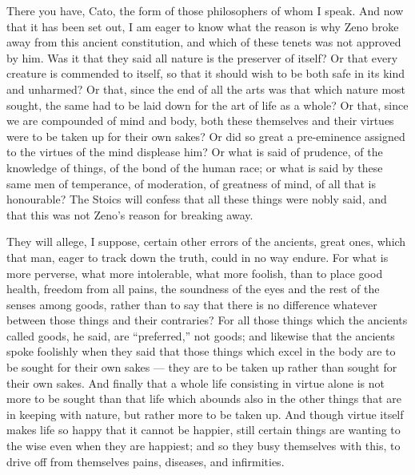  There you have, Cato, the form of those philosophers of whom I speak. And now that it has been set out, I am eager to know what the reason is why Zeno broke away from this ancient constitution, and which of these tenets was not approved by him. Was it that they said all nature is the preserver of itself? Or that every creature is commended to itself, so that it should wish to be both safe in its kind and unharmed? Or that, since the end of all the arts was that which nature most sought, the same had to be laid down for the art of life as a whole? Or that, since we are compounded of mind and body, both these themselves and their virtues were to be taken up for their own sakes? Or did so great a pre-eminence assigned to the virtues of the mind displease him? Or what is said of prudence, of the knowledge of things, of the bond of the human race; or what is said by these same men of temperance, of moderation, of greatness of mind, of all that is honourable? The Stoics will confess that all these things were nobly said, and that this was not Zeno's reason for breaking away.

 They will allege, I suppose, certain other errors of the ancients, great ones, which that man, eager to track down the truth, could in no way endure. For what is more perverse, what more intolerable, what more foolish, than to place good health, freedom from all pains, the soundness of the eyes and the rest of the senses among goods, rather than to say that there is no difference whatever between those things and their contraries? For all those things which the ancients called goods, he said, are ``preferred,'' not goods; and likewise that the ancients spoke foolishly when they said that those things which excel in the body are to be sought for their own sakes — they are to be taken up rather than sought for their own sakes. And finally that a whole life consisting in virtue alone is not more to be sought than that life which abounds also in the other things that are in keeping with nature, but rather more to be taken up. And though virtue itself makes life so happy that it cannot be happier, still certain things are wanting to the wise even when they are happiest; and so they busy themselves with this, to drive off from themselves pains, diseases, and infirmities.

